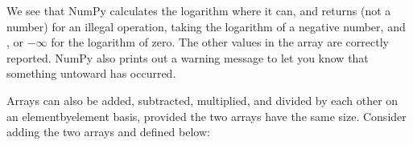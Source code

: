 \documentclass[letterpaper,10pt,english]{sphinxmanual}
\begin{document}
\begin{sphinxVerbatim}[commandchars=\\\{\},numbers=left,firstnumber=1,stepnumber=1]
\PYG{p}{[}      \PYG{p}{]}

\PYG{p}{[}            
\PYG{g+go}{                 1.609])}
\end{sphinxVerbatim}

\sphinxAtStartPar
We see that NumPy calculates the logarithm where it can, and returns  (not a number) for an illegal operation, taking the logarithm of a negative number, and , or \(-\infty\) for the logarithm of zero.  The other values in the array are correctly reported.  NumPy also prints out a warning message to let you know that something untoward has occurred.

\sphinxAtStartPar
Arrays can also be added, subtracted, multiplied, and divided by each other on an element\sphinxhyphen{}by\sphinxhyphen{}element basis, provided the two arrays have the same size.  Consider adding the two arrays  and  defined below:

\begin{sphinxVerbatim}[commandchars=\\\{\},numbers=left,firstnumber=1,stepnumber=1]
  \PYG{p}{[}  \PYG{p}{]}

  \PYG{p}{[}  \PYG{p}{]}

\PYG{p}{[}       \PYG{p}{]}
\end{sphinxVerbatim}
\end{document}
